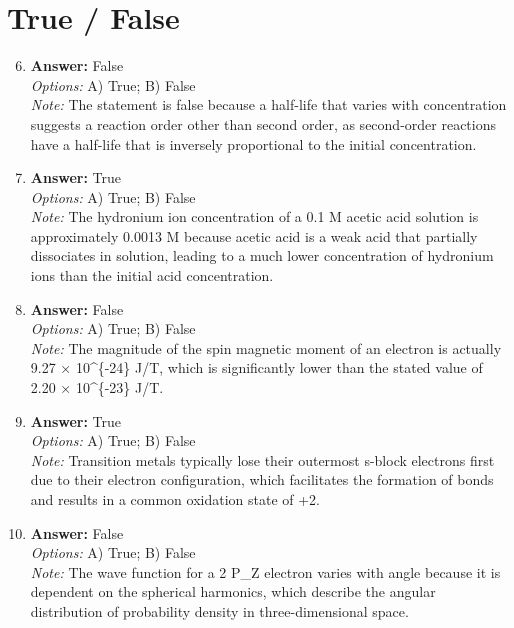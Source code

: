 \documentclass[12pt]{article}
\begin{document}
\section*{True / False}
\begin{enumerate}[label=\arabic*.]
\setcounter{enumi}{5}
\item \textbf{Answer:} False
\\ \textit{Options:} A) True; B) False
\\ \textit{Note:} The statement is false because a half-life that varies with concentration suggests a reaction order other than second order, as second-order reactions have a half-life that is inversely proportional to the initial concentration.
\item \textbf{Answer:} True
\\ \textit{Options:} A) True; B) False
\\ \textit{Note:} The hydronium ion concentration of a 0.1 M acetic acid solution is approximately 0.0013 M because acetic acid is a weak acid that partially dissociates in solution, leading to a much lower concentration of hydronium ions than the initial acid concentration.
\item \textbf{Answer:} False
\\ \textit{Options:} A) True; B) False
\\ \textit{Note:} The magnitude of the spin magnetic moment of an electron is actually 9.27 × 10^\{-24\} J/T, which is significantly lower than the stated value of 2.20 × 10^\{-23\} J/T.
\item \textbf{Answer:} True
\\ \textit{Options:} A) True; B) False
\\ \textit{Note:} Transition metals typically lose their outermost s-block electrons first due to their electron configuration, which facilitates the formation of bonds and results in a common oxidation state of +2.
\item \textbf{Answer:} False
\\ \textit{Options:} A) True; B) False
\\ \textit{Note:} The wave function for a 2 P\_Z electron varies with angle because it is dependent on the spherical harmonics, which describe the angular distribution of probability density in three-dimensional space.
\end{enumerate}
\end{document}
